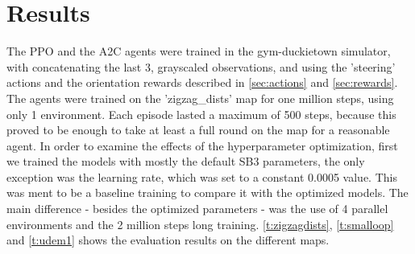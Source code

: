\documentclass{article}
\begin{document}
\section{\large{Results}}
The PPO and the A2C agents were trained in the gym-duckietown simulator, with concatenating the last 3, grayscaled observations, and using the 'steering' actions and the orientation rewards described in \autoref{sec:actions} and \autoref{sec:rewards}. The agents were trained on the 'zigzag\_dists' map for one million steps, using only 1 environment. Each episode lasted a maximum of 500 steps, because this proved to be enough to take at least a full round on the map for a reasonable agent. 
In order to examine the effects of the hyperparameter optimization, first we trained the models with mostly the default SB3 parameters, the only exception was the learning rate, which was set to a constant 0.0005 value. This was ment to be a baseline training to compare it with the optimized models. The main difference - besides the optimized parameters - was the use of 4 parallel environments and the 2 million steps long training. 
\autoref{t:zigzagdists}, \autoref{t:smalloop} and \autoref{t:udem1} shows the evaluation results on the different maps.
\end{document}
